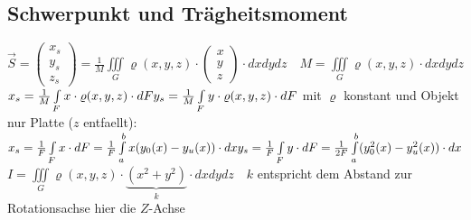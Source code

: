 \subsection{Schwerpunkt und Trägheitsmoment }
$\boxed{\vec{S}=\begin{pmatrix}
	x_s\\
	y_s\\
	z_s                                            
\end{pmatrix}=\frac{1}{M}\iiint\limits_G \varrho(x,y,z) \cdot
\begin{pmatrix}
	x\\
	y\\
	z                                            
\end{pmatrix}\cdot dxdydz \quad M=\iiint\limits_G \varrho(x,y,z) \cdot
dxdydz}$\\

$x_s=\frac{1}{M} \int\limits_F x \cdot \varrho(x,y,z)\cdot dF\\
y_s=\frac{1}{M} \int\limits_F y \cdot \varrho(x,y,z)\cdot dF\\$
mit $\varrho$ konstant und Objekt nur Platte ($z$ entfaellt):\\
$
x_s=\frac{1}{F} \int\limits_F x\cdot dF = \frac{1}{F} \int\limits_a^b
x(y_0(x)-y_u(x))\cdot dx\\
y_s=\frac{1}{F} \int\limits_F y\cdot dF = \frac{1}{2F} \int\limits_a^b
(y_0^2(x)-y_u^2(x))\cdot dx$\\

$\boxed{I=\iiint\limits_G \varrho(x,y,z)\cdot
\underbrace{(x^2+y^2)}_{k}\cdot
dxdydz}\quad k$ entspricht dem Abstand zur Rotationsachse hier die $Z$-Achse




